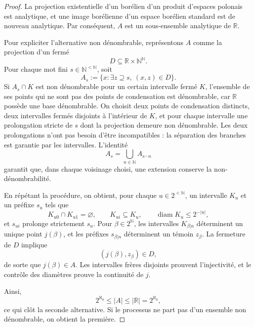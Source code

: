 \begin{proof}
La projection existentielle d'un borélien d'un produit d'espaces polonais
est analytique, et une image borélienne d'un espace borélien standard est de
nouveau analytique. Par conséquent, \(A\) est un sous-ensemble analytique de
\(\mathbb R\).

Pour expliciter l'alternative non dénombrable, représentons \(A\) comme
la projection d'un fermé
\[
 D\subseteq\mathbb R\times\mathbb N^{\mathbb N}.
\]
Pour chaque mot fini \(s\in\mathbb N^{<\mathbb N}\), soit
\[
 A_s:=\{x:\exists z\supseteq s,\ (x,z)\in D\}.
\]
Si \(A_s\cap K\) est non dénombrable pour un certain intervalle fermé \(K\),
l'ensemble de ses points qui ne sont pas des points de condensation est dénombrable, car
\(\mathbb R\) possède une base dénombrable. On choisit deux points de condensation
distincts, deux intervalles fermés disjoints à l'intérieur de \(K\), et pour chaque
intervalle une prolongation stricte de \(s\) dont la projection demeure non
dénombrable. Les deux prolongations n'ont pas besoin d'être incompatibles : la
séparation des branches est garantie par les intervalles. L'identité
\[
 A_s=\bigcup_{n\in\mathbb N}A_{s^\frown n}
\]
garantit que, dans chaque voisinage choisi, une extension conserve la non-
dénombrabilité.

En répétant la procédure, on obtient, pour chaque
\(u\in2^{<\mathbb N}\), un intervalle \(K_u\) et un préfixe \(s_u\) tels que
\[
 K_{u0}\cap K_{u1}=\varnothing,
 \qquad
 K_{ui}\subseteq K_u,
 \qquad
 \operatorname{diam}K_u\leq2^{-|u|},
\]
et \(s_{ui}\) prolonge strictement \(s_u\). Pour
\(\beta\in2^{\mathbb N}\), les intervalles
\(K_{\beta|n}\) déterminent un unique point \(j(\beta)\), et les préfixes
\(s_{\beta|n}\) déterminent un témoin \(z_\beta\). La fermeture de \(D\)
implique
\[
 (j(\beta),z_\beta)\in D,
\]
de sorte que \(j(\beta)\in A\). Les intervalles frères disjoints prouvent
l'injectivité, et le contrôle des diamètres prouve la continuité de \(j\).

Ainsi,
\[
 2^{\aleph_0}\leq |A|\leq|\mathbb R|=2^{\aleph_0},
\]
ce qui clôt la seconde alternative. Si le processus ne part pas d'un ensemble
non dénombrable, on obtient la première.
\end{proof}

